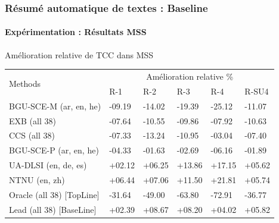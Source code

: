 \documentclass[xcolor=table]{beamer}
\begin{document}
\begin{frame}
\frametitle{Résumé automatique de textes : Baseline}
\framesubtitle{Expérimentation : Résultats MSS}
	
\begin{block}{Amélioration relative de TCC dans MSS}
	\scriptsize\bfseries
	\begin{tabular}{p{}p{}p{}p{}p{}p{}} 
		\hline \hline
		\multirow{2}{*}{Methods} & \multicolumn{5}{c}{Amélioration relative \%}\\
		\cline{2-6}
		& R-1	& R-2	& R-3	& R-4	& R-SU4\\
		\hline
		BGU-SCE-M (ar, en, he)		& -09.19	& -14.02	& -19.39	& -25.12	& -11.07\\
		EXB (all 38)				& -07.64	& -10.55	& -09.86	& -07.92	& -10.63\\
		CCS (all 38)				& -07.33	& -13.24	& -10.95	& -03.04	& -07.40\\
		BGU-SCE-P (ar, en, he)		& -04.33	& -01.63	& -02.69	& -06.16	& -01.89\\
		UA-DLSI (en, de, es)		& +02.12	& +06.25	& +13.86	& +17.15	& +05.62\\
		NTNU (en, zh)				& +06.44	& +07.06	& +11.50	& +21.81	& +05.74\\
		\hline
		Oracle (all 38) [TopLine]	& -31.64	& -49.00	& -63.80	& -72.91	& -36.77\\
		Lead (all 38) [BaseLine]	& +02.39	& +08.67	& +08.20	& +04.02	& +05.82\\
		\hline \hline
	\end{tabular}
\end{block}
	
\end{frame}
\end{document}
